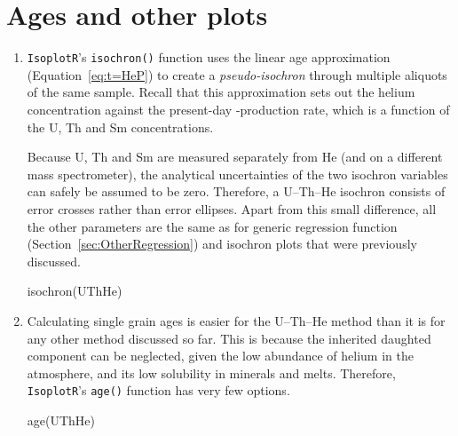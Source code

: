 \begin{refsection}
\begin{enumerate}
\end{enumerate}

\section{Ages and other plots}

\begin{enumerate}
  
\item \texttt{IsoplotR}'s \texttt{isochron()} function uses the linear
  age approximation (Equation~\ref{eq:t=HeP}) to create a
  \textit{pseudo-isochron} through multiple aliquots of the same
  sample.  Recall that this approximation sets out the helium
  concentration against the present-day \textalpha-production rate,
  which is a function of the U, Th and Sm concentrations.

Because U, Th and Sm are measured separately from He (and on a
different mass spectrometer), the analytical uncertainties of the two
isochron variables can safely be assumed to be zero. Therefore, a
U--Th--He isochron consists of error crosses rather than error
ellipses.  Apart from this small difference, all the other parameters
are the same as for generic regression function
(Section~\ref{sec:OtherRegression}) and isochron plots that were
previously discussed.

\begin{console}
isochron(UThHe)
\end{console}

\item Calculating single grain ages is easier for the U--Th--He method than
it is for any other method discussed so far. This is because the
inherited daughted component can be neglected, given the low abundance
of helium in the atmosphere, and its low solubility in minerals and
melts. Therefore, \texttt{IsoplotR}'s \texttt{age()} function has very
few options.

\begin{console}
age(UThHe)
\end{console}


\end{enumerate}
\end{refsection}
